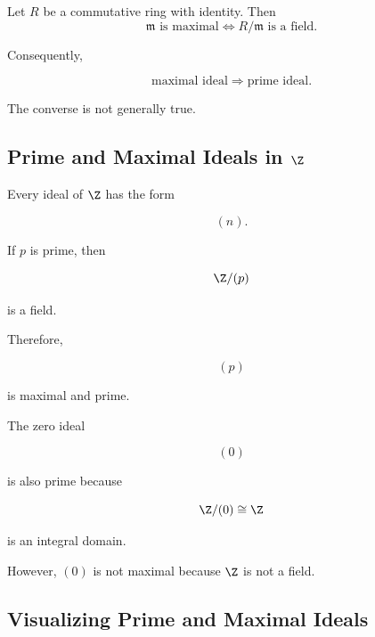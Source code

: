 \begin{theorem}
Let \(R\) be a commutative ring with identity. Then
\[ \mathfrak m\text{ is maximal}
\iff
R/\mathfrak m\text{ is a field}. \]
\end{theorem}

Consequently,

\[ \boxed{\text{maximal ideal}\Longrightarrow\text{prime ideal}.} \]

The converse is not generally true.

\subsection{Prime and Maximal Ideals in \(\Z\)}
\label{subsec:prime-maximal-z}

Every ideal of \(\Z\) has the form

\[ (n). \]

If \(p\) is prime, then

\[ \Z/(p) \]

is a field.

Therefore,

\[ (p) \]

is maximal and prime.

The zero ideal

\[ (0) \]

is also prime because

\[ \Z/(0)\cong\Z \]

is an integral domain.

However, \((0)\) is not maximal because \(\Z\) is not a field.

\subsection{Visualizing Prime and Maximal Ideals}
\label{subsec:prime-maximal-visual}

\begin{center}
\end{center}

